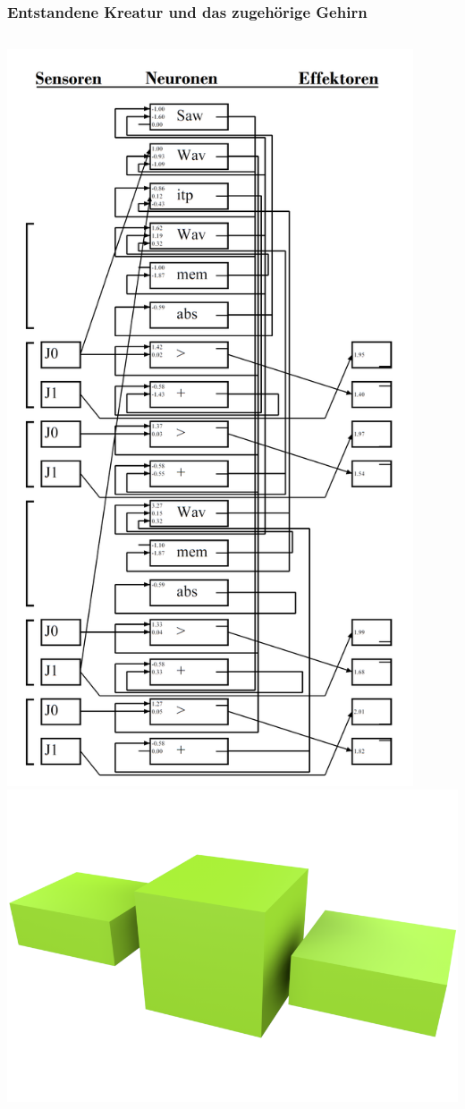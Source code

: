 \documentclass{beamer}
\begin{document}
\begin{frame}
	\frametitle{Entstandene Kreatur und das zugehörige Gehirn}
	\begin{columns}
		\centering
		\includegraphics[width=0.9\textwidth]{img/brain(1).png} \pause
		\centering
		\longrightarrow
		\centering
		\includegraphics[width=\textwidth]{img/1.png}
	\end{columns}
\end{frame}
\end{document}
